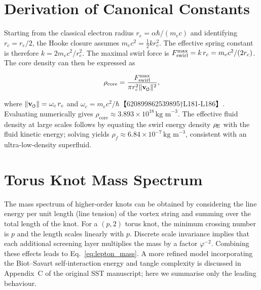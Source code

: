 \documentclass[11pt]{article}
\newcommand{\vnorm}{\lVert \mathbf{v}_{\mkern-2mu\scriptscriptstyle\boldsymbol{\circlearrowleft}} \rVert}  %
\newcommand{\rhoF}{\rho_{\!f}}\newcommand{\rhof}{\rho_{\!f}}     %
\newcommand{\rc}{r_c}                                    %
\newcommand{\rhocore}{\rho_{\text{core}}}
\newcommand{\phiG}{\varphi}
\newcommand{\me}{m_e}
\begin{document}
\section{Derivation of Canonical Constants}


\label{app:constants}


Starting from the classical electron radius $r_e = \alpha\hbar/(\me c)$ and identifying $\rc = r_e/2$, the Hooke closure assumes $m_e c^2 = \tfrac{1}{2} k r_e^2$.  The effective spring constant is therefore $k = 2 m_e c^2/r_e^2$.  The maximal swirl force is $F_{\rm swirl}^{\max} = k\,\rc = m_e c^2/(2\rc)$.  The core density can then be expressed as


\begin{equation}


    \rhocore = \frac{F_{\rm swirl}^{\max}}{\pi \rc^2 \vnorm^2},


\end{equation}


where $\vnorm = \omega_c\,\rc$ and $\omega_c = m_e c^2/\hbar$【620899862539895†L181-L186】.  Evaluating numerically gives $\rhocore \approx 3.893\times 10^{18}\,\text{kg m}^{-3}$.  The effective fluid density at large scales follows by equating the swirl energy density $\rho_{\!E}$ with the fluid kinetic energy; solving yields $\rhoF \approx 6.84\times 10^{-7}\,\text{kg m}^{-3}$, consistent with an ultra‑low‑density superfluid.






\section{Torus Knot Mass Spectrum}


\label{app:knots}


The mass spectrum of higher‑order knots can be obtained by considering the line energy per unit length (line tension) of the vortex string and summing over the total length of the knot.  For a $(p,2)$ torus knot, the minimum crossing number is $p$ and the length scales linearly with $p$.  Discrete scale invariance implies that each additional screening layer multiplies the mass by a factor $\phiG^{-2}$.  Combining these effects leads to Eq.~\eqref{eq:lepton_mass}.  A more refined model incorporating the Biot–Savart self‑interaction energy and tangle complexity is discussed in Appendix~C of the original SST manuscript; here we summarise only the leading behaviour.
\end{document}
